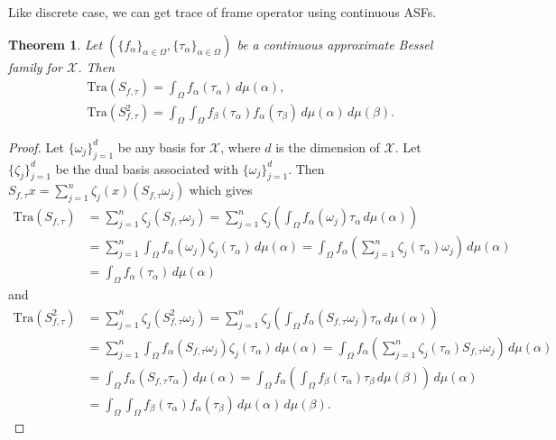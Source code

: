 \documentclass{amsart}
\newtheorem{theorem}{Theorem}[section]
\begin{document}
  
  
 
  
  
  Like discrete case, we can get trace of frame operator using continuous ASFs.
  \begin{theorem}\label{TRACEFORMULA}
  	Let $(\{f_\alpha\}_{\alpha\in \Omega}, \{\tau_\alpha\}_{\alpha\in \Omega})$ be a continuous approximate Bessel family  for $\mathcal{X}$. Then 
  	\begin{align*}
  		&	\text{Tra}(S_{f,\tau})=\int_\Omega f_\alpha (\tau_\alpha)\, d \mu(\alpha),\\
  		&	\text{Tra}(S_{f,\tau}^2)=\int_\Omega\int_\Omega f_\beta (\tau_\alpha)f_\alpha (\tau_\beta)\, d \mu(\alpha)\, d \mu(\beta).
  	\end{align*}
  \end{theorem}
  \begin{proof}
  	Let $\{\omega_j\}_{j=1}^d$ be any basis for $\mathcal{X}$, where $d$ is the dimension of $\mathcal{X}$. Let $\{\zeta_j\}_{j=1}^d$ be the dual basis associated with $\{\omega_j\}_{j=1}^d$. Then $S_{f,\tau}x=	\sum_{j=1}^n\zeta_j(x)(S_{f,\tau}\omega_j)$ which gives 
  	\begin{align*}
  	\text{Tra}(S_{f,\tau})&=		\sum_{j=1}^n\zeta_j(S_{f,\tau}\omega_j)=	\sum_{j=1}^n\zeta_j\left(\int_\Omega f_\alpha (\omega_j)\tau_\alpha\,d\mu(\alpha)\right)\\
  	&=\sum_{j=1}^n\int_\Omega f_\alpha (\omega_j)\zeta_j(\tau_\alpha)\,d\mu(\alpha)=\int_\Omega f_\alpha \left(\sum_{j=1}^n\zeta_j(\tau_\alpha)\omega_j\right)\,d\mu(\alpha)\\
  	&=\int_\Omega f_\alpha (\tau_\alpha)\, d \mu(\alpha)
  	\end{align*}
  and 
  	\begin{align*}
  	 	\text{Tra}(S^2_{f,\tau})&=		\sum_{j=1}^n\zeta_j(S^2_{f,\tau}\omega_j)=	\sum_{j=1}^n\zeta_j\left(\int_\Omega f_\alpha (S_{f,\tau}\omega_j)\tau_\alpha\,d\mu(\alpha)\right)\\
  	&=\sum_{j=1}^n\int_\Omega f_\alpha (S_{f,\tau}\omega_j)\zeta_j(\tau_\alpha)\,d\mu(\alpha)=\int_\Omega f_\alpha \left(\sum_{j=1}^n\zeta_j(\tau_\alpha)S_{f,\tau}\omega_j\right)\,d\mu(\alpha)\\
  	&=\int_\Omega f_\alpha (S_{f,\tau}\tau_\alpha)\, d \mu(\alpha)=\int_\Omega f_\alpha\left(\int_{\Omega}f_\beta (\tau_\alpha)\tau_\beta \, d \mu (\beta)\right)\, d \mu(\alpha)\\
  	&=\int_\Omega\int_\Omega f_\beta (\tau_\alpha)f_\alpha (\tau_\beta)\, d \mu(\alpha)\, d \mu(\beta).
  	\end{align*}
  \end{proof}
\end{document}

